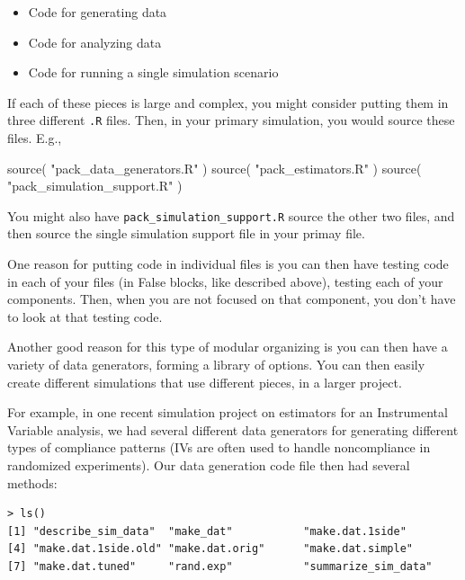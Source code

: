 \documentclass[
]{book}
\newenvironment{Shaded}{\begin{snugshade}}{\end{snugshade}}
\newcommand{\FunctionTok}[1]{\textcolor[rgb]{0.00,0.00,0.00}{#1}}
\newcommand{\NormalTok}[1]{#1}
\newcommand{\StringTok}[1]{\textcolor[rgb]{0.31,0.60,0.02}{#1}}
\providecommand{\tightlist}{%
  \setlength{\itemsep}{0pt}\setlength{\parskip}{0pt}}
\begin{document}
\begin{itemize}
\tightlist
\item
  Code for generating data
\item
  Code for analyzing data
\item
  Code for running a single simulation scenario
\end{itemize}

If each of these pieces is large and complex, you might consider putting them in three different \texttt{.R} files.
Then, in your primary simulation, you would source these files.
E.g.,

\begin{Shaded}
\begin{Highlighting}[]
\FunctionTok{source}\NormalTok{( }\StringTok{"pack\_data\_generators.R"}\NormalTok{ )}
\FunctionTok{source}\NormalTok{( }\StringTok{"pack\_estimators.R"}\NormalTok{ )}
\FunctionTok{source}\NormalTok{( }\StringTok{"pack\_simulation\_support.R"}\NormalTok{ )}
\end{Highlighting}
\end{Shaded}

You might also have \texttt{pack\_simulation\_support.R} source the other two files, and then source the single simulation support file in your primay file.

One reason for putting code in individual files is you can then have testing code in each of your files (in False blocks, like described above), testing each of your components.
Then, when you are not focused on that component, you don't have to look at that testing code.

Another good reason for this type of modular organizing is you can then have a variety of data generators, forming a library of options.
You can then easily create different simulations that use different pieces, in a larger project.

For example, in one recent simulation project on estimators for an Instrumental Variable analysis, we had several different data generators for generating different types of compliance patterns (IVs are often used to handle noncompliance in randomized experiments).
Our data generation code file then had several methods:

\begin{verbatim}
> ls()
[1] "describe_sim_data"  "make_dat"           "make.dat.1side"     
[4] "make.dat.1side.old" "make.dat.orig"      "make.dat.simple"
[7] "make.dat.tuned"     "rand.exp"           "summarize_sim_data"
\end{verbatim}
\end{document}
